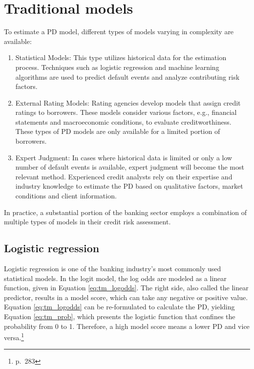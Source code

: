 \chapter{Traditional models}
\label{ch:TM}

To estimate a PD model, different types of models varying in complexity are available:

\begin{enumerate}
  \item Statistical Models: This type utilizes historical data for the estimation process. Techniques such as logistic regression and machine learning algorithms are used to predict default events and analyze contributing risk factors.
  \item External Rating Models: Rating agencies develop models that assign credit ratings to borrowers. These models consider various factors, e.g., financial statements and macroeconomic conditions, to evaluate creditworthiness. These types of PD models are only available for a limited portion of borrowers. 
  \item Expert Judgment: In cases where historical data is limited or only a low number of default events is available, expert judgment will become the most relevant method. Experienced credit analysts rely on their expertise and industry knowledge to estimate the PD based on qualitative factors, market conditions and client information.
\end{enumerate}

In practice, a substantial portion of the banking sector employs a combination of multiple types of models in their credit risk assessment.

\section{Logistic regression}
Logistic regression is one of the banking industry's most commonly used statistical models. In the logit model, the log odds are modeled as a linear function, given in Equation \ref{eq:tm_logodds}. The right side, also called the linear predictor, results in a model score, which can take any negative or positive value. Equation \ref{eq:tm_logodds} can be re-formulated to calculate the \ac{PD}, yielding Equation \ref{eq:tm_prob}, which presents the logistic function that confines the probability from 0 to 1. Therefore, a high model score means a lower \ac{PD} and vice versa.\footnote{\cite{Kuhn:2013} p.~283}

